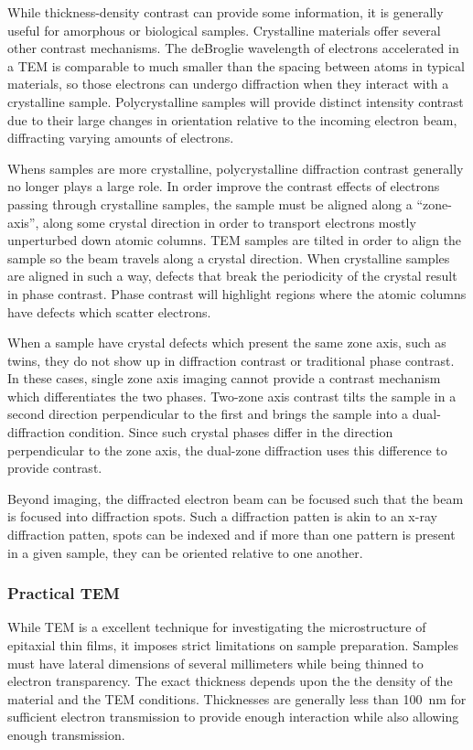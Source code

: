 While thickness-density contrast can provide some information, it is generally useful for amorphous or biological samples. Crystalline materials offer several other contrast mechanisms. The deBroglie wavelength of electrons accelerated in a TEM is comparable to much smaller than the spacing between atoms in typical materials, so those electrons can undergo diffraction when they interact with a crystalline sample. Polycrystalline samples will provide distinct intensity contrast due to their large changes in orientation relative to the incoming electron beam, diffracting varying amounts of electrons.

Whens samples are more crystalline, polycrystalline diffraction contrast generally no longer plays a large role. In order improve the contrast effects of electrons passing through crystalline samples, the sample must be aligned along a ``zone-axis'', along some crystal direction in order to transport electrons mostly unperturbed down atomic columns. TEM samples are tilted in order to align the sample so the beam travels along a crystal direction. When crystalline samples are aligned in such a way, defects that break the periodicity of the crystal result in phase contrast. Phase contrast will highlight regions where the atomic columns have defects which scatter electrons.

When a sample have crystal defects which present the same zone axis, such as twins, they do not show up in diffraction contrast or traditional phase contrast. In these cases, single zone axis imaging cannot provide a contrast mechanism which differentiates the two phases. Two-zone axis contrast tilts the sample in a second direction perpendicular to the first and brings the sample into a dual-diffraction condition. Since such crystal phases differ in the direction perpendicular to the zone axis, the dual-zone diffraction uses this difference to provide contrast.

Beyond imaging, the diffracted electron beam can be focused such that the beam is focused into diffraction spots. Such a diffraction patten is akin to an x-ray diffraction patten, spots can be indexed and if more than one pattern is present in a given sample, they can be oriented relative to one another.

\subsubsection{Practical TEM}
While TEM is a excellent technique for investigating the microstructure of epitaxial thin films, it imposes strict limitations on sample preparation. Samples must have lateral dimensions of several millimeters while being thinned to electron transparency. The exact thickness depends upon the the density of the material and the TEM conditions. Thicknesses are generally less than 100~nm for sufficient electron transmission to provide enough interaction while also allowing enough transmission.

